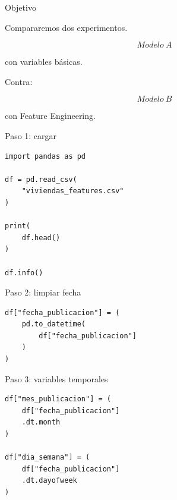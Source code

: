 \documentclass[aspectratio=169,11pt]{beamer}
\begin{document}

\begin{frame}{Objetivo}

Compararemos dos experimentos.

\[
\boxed{
Modelo\ A
}
\]

con variables básicas.

Contra:

\[
\boxed{
Modelo\ B
}
\]

con Feature Engineering.

\end{frame}


\begin{frame}[fragile]{Paso 1: cargar}

\begin{lstlisting}
import pandas as pd

df = pd.read_csv(
    "viviendas_features.csv"
)

print(
    df.head()
)

df.info()
\end{lstlisting}

\end{frame}


\begin{frame}[fragile]{Paso 2: limpiar fecha}

\begin{lstlisting}
df["fecha_publicacion"] = (
    pd.to_datetime(
        df["fecha_publicacion"]
    )
)
\end{lstlisting}

\end{frame}


\begin{frame}[fragile]{Paso 3: variables temporales}

\begin{lstlisting}
df["mes_publicacion"] = (
    df["fecha_publicacion"]
    .dt.month
)

df["dia_semana"] = (
    df["fecha_publicacion"]
    .dt.dayofweek
)
\end{lstlisting}

\end{frame}
\end{document}
